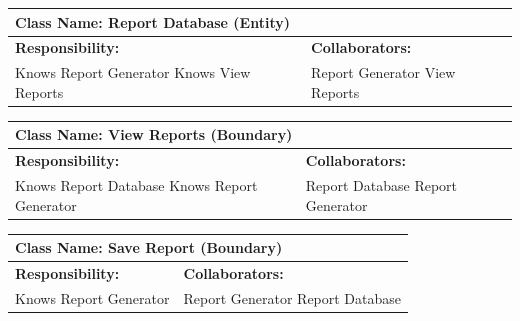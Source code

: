 \documentclass[]{article}
\begin{document}
	\begin{table}[H]
		\centering
		\begin{tabular}{|p{7cm}|p{7cm}|}
		\hline 
		 \multicolumn{2}{|l|}{\textbf{Class Name: Report Database (Entity)}} \\
		\hline
		\textbf{Responsibility:} & \textbf{Collaborators:} \\
		\hline
		Knows Report Generator \newline	
		Knows View Reports & Report Generator \newline	
		View Reports \\
		\hline
		\end{tabular}
	\end{table}
	
	\begin{table}[H]
		\centering
		\begin{tabular}{|p{7cm}|p{7cm}|}
		\hline 
		 \multicolumn{2}{|l|}{\textbf{Class Name: View Reports (Boundary)}} \\
		\hline
		\textbf{Responsibility:} & \textbf{Collaborators:} \\
		\hline
		Knows Report Database \newline	
		Knows Report Generator & Report Database \newline	
		Report Generator \\
		\hline
		\end{tabular}
	\end{table} 	
	
	\begin{table}[H]
		\centering
		\begin{tabular}{|p{7cm}|p{7cm}|}
		\hline 
		 \multicolumn{2}{|l|}{\textbf{Class Name: Save Report (Boundary)}} \\
		\hline
		\textbf{Responsibility:} & \textbf{Collaborators:} \\
		\hline
		Knows Report Generator & Report Generator \newline		
		Report Database \\
		\hline
		\end{tabular}
	\end{table}
\end{document}
